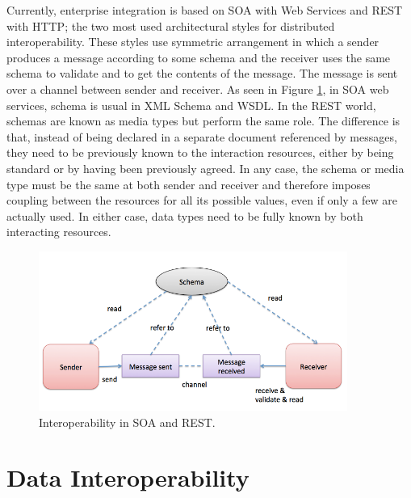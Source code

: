  Currently, enterprise integration is based on SOA with Web Services and REST with HTTP; the two most used architectural styles for distributed interoperability. These styles use symmetric arrangement in which a sender produces a message according to some schema and the receiver uses the same schema to validate and to get the contents of the message. The message is sent over a channel between sender and receiver. As seen in Figure \ref{fig:interoperability}, in SOA web services, schema is usual in XML Schema and WSDL. In the REST world, schemas are known as media types but perform the same role. The difference is that, instead of being declared in a separate document referenced by messages, they need to be previously known to the interaction resources, either by being standard or by having been previously agreed. In any case, the schema or media type must be the same at both sender and receiver and therefore imposes coupling between the resources for all its possible values, even if only a few are actually used. In either case, data types need to be fully known by both interacting resources.
\begin{figure}[!htb]
  \centering
  \includegraphics[width=0.9\textwidth]{Figures/schema.png}
  \caption[Interoperability in SOA and REST.]{Interoperability in SOA and REST.}
  \label{fig:interoperability}
\end{figure}


\section{Data Interoperability}
\label{section:InteroperabilityData}

